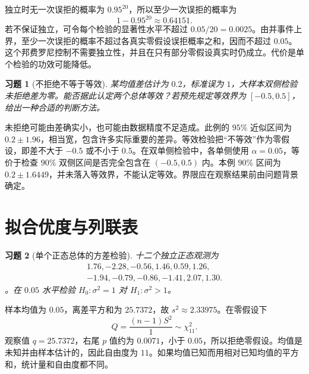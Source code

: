 \documentclass[12pt,fontset=fandol]{ctexart}
\newtheorem{exercise}{习题}[section]
\begin{document}
\begin{solve}\label{a:B14.3}独立时无一次误拒的概率为 $0.95^{20}$，所以至少一次误拒的概率为\[1-0.95^{20}\approx0.64151.\]若不保证独立，可令每个检验的显著性水平不超过 $0.05/20=0.0025$。由并事件上界，至少一次误拒的概率不超过各真实零假设误拒概率之和，因而不超过 $0.05$。这个邦费罗尼控制不需要独立性，并且在只有部分零假设真实时仍成立。代价是单个检验的功效可能降低。\end{solve}

\begin{exercise}[不拒绝不等于等效]\label{q:B14.4}
某均值差估计为 $0.2$，标准误为 $1$，大样本双侧检验未拒绝差为零。能否据此认定两个总体等效？若预先规定等效界为 $[-0.5,0.5]$，给出一种合适的判断方法。\par{}
\end{exercise}

\begin{solve}\label{a:B14.4}未拒绝可能由差确实小，也可能由数据精度不足造成。此例的 $95\%$ 近似区间为 $0.2\pm1.96$，相当宽，包含许多实际重要的差异。等效检验把“不等效”作为零假设，即差不大于 $-0.5$ 或不小于 $0.5$。在双单侧检验中，各单侧使用 $\alpha=0.05$，等价于检查 $90\%$ 双侧区间是否完全包含在 $(-0.5,0.5)$ 内。本例 $90\%$ 区间为 $0.2\pm1.6449$，并未落入等效界，不能认定等效。界限应在观察结果前由问题背景确定。\end{solve}

\clearpage\section{拟合优度与列联表}

\begin{exercise}[单个正态总体的方差检验]\label{q:M-P9-3}
十二个独立正态观测为 \[\begin{gathered}1.76,-2.28,-0.56,1.46,0.59,1.26,\\-1.94,-0.79,-0.86,-1.41,2.07,1.30.\end{gathered}\]。在 $0.05$ 水平检验 $H_0:\sigma^2=1$ 对 $H_1:\sigma^2>1$。\par{}
\end{exercise}

\begin{solve}\label{a:M-P9-3}样本均值为 $0.05$，离差平方和为 $25.7372$，故 $s^2\approx2.33975$。在零假设下\[Q=\frac{(n-1)S^2}{1}\sim\chi^2_{11}.\]观察值 $q=25.7372$，右尾 $p$ 值约为 $0.0071$，小于 $0.05$，所以拒绝零假设。均值是未知并由样本估计的，因此自由度为 $11$。如果均值已知而用相对已知均值的平方和，统计量和自由度都不同。\end{solve}
\end{document}
